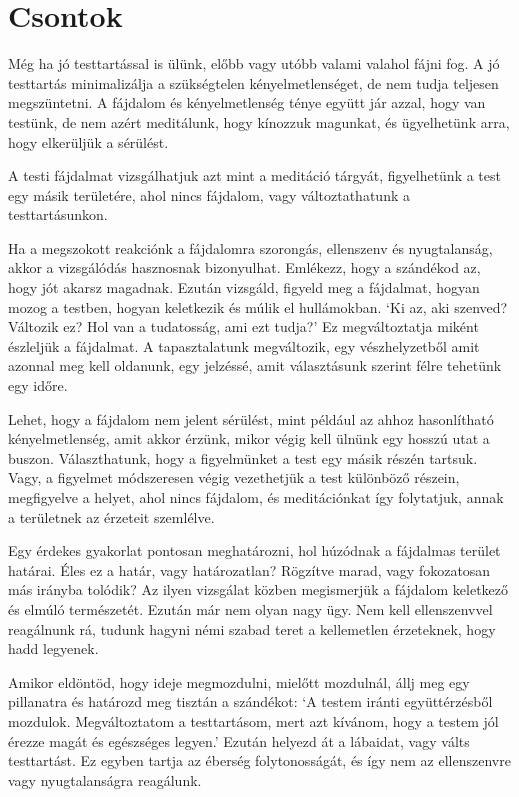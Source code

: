 \chapter{Csontok}


\noindent Még ha jó testtartással is ülünk, előbb vagy utóbb valami
valahol fájni fog. A jó testtartás minimalizálja a szükségtelen
kényelmetlenséget, de nem tudja teljesen megszüntetni. A fájdalom és
kényelmetlenség ténye együtt jár azzal, hogy van testünk, de nem azért
meditálunk, hogy kínozzuk magunkat, és ügyelhetünk arra, hogy elkerüljük
a sérülést.

A testi fájdalmat vizsgálhatjuk azt mint a meditáció tárgyát,
figyelhetünk a test egy másik területére, ahol nincs fájdalom, vagy
változtathatunk a testtartásunkon.

Ha a megszokott reakciónk a fájdalomra szorongás, ellenszenv és
nyugtalanság, akkor a vizsgálódás hasznosnak bizonyulhat. Emlékezz, hogy
a szándékod az, hogy jót akarsz magadnak. Ezután vizsgáld, figyeld meg a
fájdalmat, hogyan mozog a testben, hogyan keletkezik és múlik el
hullámokban. `Ki az, aki szenved? Változik ez? Hol van a tudatosság, ami
ezt tudja?' Ez megváltoztatja miként észleljük a fájdalmat. A
tapasztalatunk megváltozik, egy vészhelyzetből amit azonnal meg kell
oldanunk, egy jelzéssé, amit választásunk szerint félre tehetünk egy
időre.

Lehet, hogy a fájdalom nem jelent sérülést, mint például az ahhoz
hasonlítható kényelmetlenség, amit akkor érzünk, mikor végig kell ülnünk
egy hosszú utat a buszon. Választhatunk, hogy a figyelmünket a test egy
másik részén tartsuk. Vagy, a figyelmet módszeresen végig vezethetjük a
test különböző részein, megfigyelve a helyet, ahol nincs fájdalom, és
meditációnkat így folytatjuk, annak a területnek az érzeteit szemlélve.

Egy érdekes gyakorlat pontosan meghatározni, hol húzódnak a fájdalmas
terület határai. Éles ez a határ, vagy határozatlan? Rögzítve marad,
vagy fokozatosan más irányba tolódik? Az ilyen vizsgálat közben
megismerjük a fájdalom keletkező és elmúló természetét. Ezután már nem
olyan nagy ügy. Nem kell ellenszenvvel reagálnunk rá, tudunk hagyni némi
szabad teret a kellemetlen érzeteknek, hogy hadd legyenek.

Amikor eldöntöd, hogy ideje megmozdulni, mielőtt mozdulnál, állj meg egy
pillanatra és határozd meg tisztán a szándékot: `A testem iránti
együttérzésből mozdulok. Megváltoztatom a testtartásom, mert azt
kívánom, hogy a testem jól érezze magát és egészséges legyen.' Ezután
helyezd át a lábaidat, vagy válts testtartást. Ez egyben tartja az
éberség folytonosságát, és így nem az ellenszenvre vagy nyugtalanságra
reagálunk.

